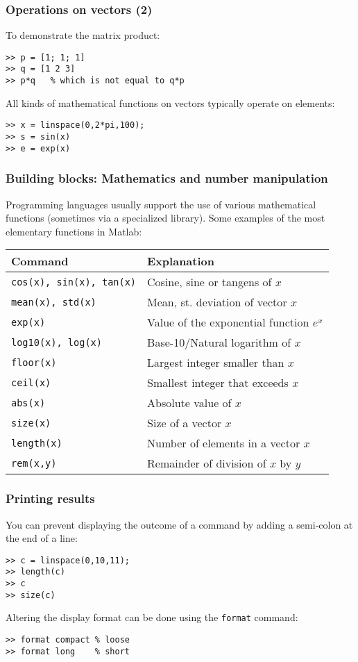 \begin{frame}[fragile]
  \frametitle{Operations on vectors (2)}
   To demonstrate the matrix product:
  \begin{lstlisting}
>> p = [1; 1; 1]
>> q = [1 2 3]
>> p*q   % which is not equal to q*p
  \end{lstlisting}\pause
  All kinds of mathematical functions on vectors typically operate on elements:
  \begin{lstlisting}
>> x = linspace(0,2*pi,100);
>> s = sin(x)
>> e = exp(x)
  \end{lstlisting}
\end{frame}

\begin{frame}
 \frametitle{Building blocks: Mathematics and number manipulation}
 Programming languages usually support the use of various mathematical functions (sometimes via a specialized library). Some examples of the most elementary functions in Matlab:
    \begin{longtable}{l!{\vrule}l}
      Command        & Explanation \\ \hline
      \texttt{cos(x), sin(x), tan(x)} & Cosine, sine or tangens of $x$ \\
      \texttt{mean(x), std(x)} & Mean, st. deviation of vector $x$ \\
      \texttt{exp(x)} & Value of the exponential function $e^x$ \\
      \texttt{log10(x), log(x)} & Base-10/Natural logarithm of $x$ \\
      \texttt{floor(x)} & Largest integer smaller than $x$ \\
      \texttt{ceil(x)} & Smallest integer that exceeds $x$ \\
      \texttt{abs(x)} & Absolute value of $x$ \\
      \texttt{size(x)} & Size of a vector $x$ \\
      \texttt{length(x)} & Number of elements in a vector $x$ \\
      \texttt{rem(x,y)} & Remainder of division of $x$ by $y$\\
    \end{longtable}
\end{frame}

\begin{frame}[fragile]
  \frametitle{Printing results}
  You can prevent displaying the outcome of a command by adding a semi-colon at the end of a line:
  \begin{lstlisting}
>> c = linspace(0,10,11);
>> length(c)
>> c
>> size(c)
  \end{lstlisting}\pause
  Altering the display format can be done using the \lstinline$format$ command:
  \begin{lstlisting}
>> format compact % loose
>> format long    % short
  \end{lstlisting}
\end{frame}

